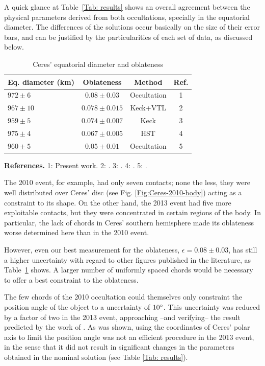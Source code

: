 \documentclass[useAMS,usenatbib]{mn2e}
\begin{document}
A quick glance at Table~\ref{Tab: results} shows an overall agreement between the physical parameters derived from both occultations, specially in the equatorial diameter. The differences of the solutions occur basically on the size of their error bars, and can be justified by the particularities of each set of data, as discussed below. 


\begin{table}
  \caption{Ceres' equatorial diameter and oblateness \label{Tab: Ceres-final}}
  \begin{centering}
  \begin{tabular}{@{}lccc}
  \hline
     Eq. diameter (km) & Oblateness & Method & Ref. \\
\hline
$972 \pm 6$  & $0.08  \pm 0.03$  & Occultation & 1\\
$967 \pm 10$ & $0.078 \pm 0.015$ & Keck+VTL    & 2 \\
$959 \pm 5$  & $0.074 \pm 0.007$ & Keck        & 3\\
$975 \pm 4$  & $0.067 \pm 0.005$ & HST         & 4\\
$960 \pm 5$  & $0.05  \pm 0.01$  & Occultation & 5\\
\hline
\end{tabular}
\par\end{centering}
\textbf{References.} 1: Present work. 2: \cite{Drummond2014}. 3: \cite{Carry2008}. 4: \cite{Thomas2005}. 5: \cite{Millis1987}.
\end{table}

The 2010 event, for example, had only seven contacts; none the less, they were well distributed over Ceres' disc (see Fig. \ref{Fig:Ceres-2010-body}) acting as a constraint to its shape. On the other hand, the 2013 event had five more exploitable contacts, but they were concentrated in certain regions of the body. In particular, the lack of chords in Ceres' southern hemisphere made its oblateness worse determined here than in the 2010 event.

However, even our best measurement for the oblateness, $\epsilon=0.08 \pm 0.03$, has still a higher uncertainty with regard to other figures published in the literature, as Table~\ref{Tab: Ceres-final} shows. A larger number of uniformly spaced chords would be necessary to offer a best constraint to the oblateness. 

The few chords of the 2010 occultation could themselves only constraint the position angle of the object to a uncertainty of $10\hbox{$^\circ$}$. This uncertainty was reduced by a factor of two in the 2013 event, approaching --and verifying-- the result predicted by the work of \cite{Drummond2014}. As was shown, using the coordinates of Ceres' polar axis to limit the position angle was not an efficient procedure in the 2013 event, in the sense that it did not result in significant changes in the parameters obtained in the nominal solution (see Table \ref{Tab: results}).
\end{document}
